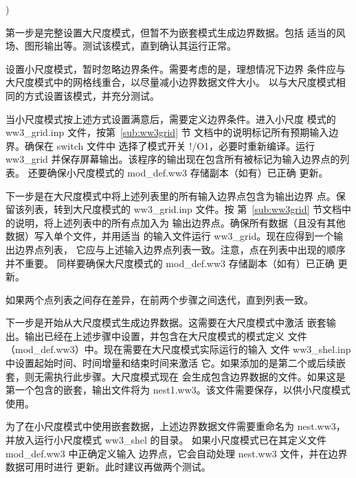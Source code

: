 \begin{list}{)}{
             \rightmargin 5mm 
              \leftmargin 10mm}

\item 第一步是完整设置大尺度模式，但暂不为嵌套模式生成边界数据。包括
      适当的风场、图形输出等。测试该模式，直到确认其运行正常。

\item 设置小尺度模式，暂时忽略边界条件。需要考虑的是，理想情况下边界
      条件应与大尺度模式中的网格线重合，以尽量减小边界数据文件大小。
      以与大尺度模式相同的方式设置该模式，并充分测试。

\item 当小尺度模式按上述方式设置满意后，需要定义边界条件。进入小尺度
      模式的 {\file ww3\_grid.inp} 文件，按第~\ref{sub:ww3grid} 节
      文档中的说明标记所有预期输入边界。确保在 {\file switch} 文件中
      选择了模式开关 {\F !/O1}，必要时重新编译。运行 {\code ww3\_grid}
      并保存屏幕输出。该程序的输出现在包含所有被标记为输入边界点的列表。
      还要确保小尺度模式的 {\file mod\_def.ww3} 存储副本（如有）已正确
      更新。

\item 下一步是在大尺度模式中将上述列表里的所有输入边界点包含为输出边界
      点。保留该列表，转到大尺度模式的 {\file ww3\_grid.inp} 文件。按
      第~\ref{sub:ww3grid} 节文档中的说明，将上述列表中的所有点加入为
      输出边界点。确保所有数据（且没有其他数据）写入单个文件，并用适当
      的输入文件运行 {\code ww3\_grid}。现在应得到一个输出边界点列表，
      它应与上述输入边界点列表一致。注意，点在列表中出现的顺序并不重要。
      同样要确保大尺度模式的 {\file mod\_def.ww3} 存储副本（如有）已正确
      更新。

\item 如果两个点列表之间存在差异，在前两个步骤之间迭代，直到列表一致。

\item 下一步是开始从大尺度模式生成边界数据。这需要在大尺度模式中激活
      嵌套输出。输出已经在上述步骤中设置，并包含在大尺度模式的模式定义
      文件（{\file mod\_def.ww3}）中。现在需要在大尺度模式实际运行的输入
      文件 {\file ww3\_shel.inp} 中设置起始时间、时间增量和结束时间来激活
      它。如果添加的是第二个或后续嵌套，则无需执行此步骤。大尺度模式现在
      会生成包含边界数据的文件。如果这是第一个包含的嵌套，输出文件将为
      {\file nest1.ww3}。该文件需要保存，以供小尺度模式使用。

\item 为了在小尺度模式中使用嵌套数据，上述边界数据文件需要重命名为
      {\file nest.ww3}，并放入运行小尺度模式 {\file ww3\_shel} 的目录。
      如果小尺度模式已在其定义文件 {\file mod\_def.ww3} 中正确定义输入
      边界点，它会自动处理 {\file nest.ww3} 文件，并在边界数据可用时进行
      更新。此时建议再做两个测试。


\end{list}
